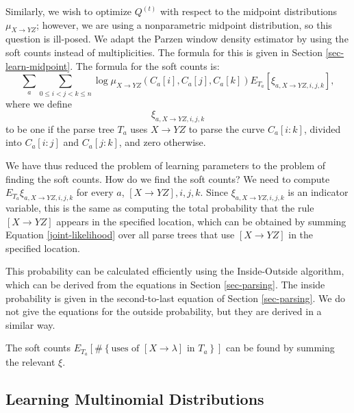 \documentclass{article}
\begin{document}
Similarly, we wish to optimize $Q^{(t)}$ with respect to the midpoint
distributions $\mu_{X\to YZ}$; however, we are using a nonparametric
midpoint distribution, so this question is ill-posed. We adapt the
Parzen window density estimator by using the soft counts instead of
multiplicities. The formula for this is given in Section
\ref{sec-learn-midpoint}.  The formula for the soft counts is:
$$\sum_a \sum_{0\le i < j < k\le n} \log \mu_{X\to YZ}(C_a[i], C_a[j], C_a[k])
 E_{T_a}\left[ \xi_{a, X\to YZ, i,j,k} \right],$$
where we define
$$\xi_{a, X\to YZ,i,j,k}$$
to be one if the parse tree $T_a$ uses $X\to YZ$ to parse the curve
$C_a[i:k]$, divided into $C_a[i:j]$ and $C_a[j:k]$, and zero otherwise.

We have thus reduced the problem of learning parameters to the problem
of finding the soft counts. How do we find the soft counts?  We need
to compute $E_{T_a} \xi_{a,X\to YZ,i,j,k}$ for every $a$, $[X\to YZ],
i,j,k$. Since $\xi_{a, X\to YZ,i,j,k}$ is an indicator variable, this
is the same as computing the total probability that the rule $[X\to
YZ]$ appears in the specified location, which can be obtained by
summing Equation \eqref{joint-likelihood} over all parse trees that
use $[X\to YZ]$ in the specified location.

This probability can be calculated efficiently using the
Inside-Outside algorithm, which can be derived from the equations in
Section \ref{sec-parsing}. The inside probability is given in the
second-to-last equation of Section \ref{sec-parsing}. We do not give
the equations for the outside probability, but they are derived in a
similar way.

The soft counts $E_{T_a}\left[ \#\left\{\mbox{uses of
    }[X\to \lambda] \mbox{ in } T_a\right\}\right]$ can be found by summing the
relevant $\xi$.

\subsection{Learning Multinomial Distributions}
\label{sec-multinomial}
\end{document}
